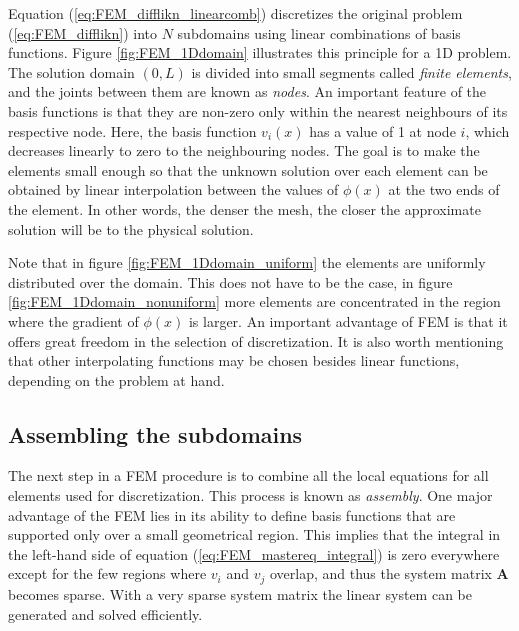 Equation (\ref{eq:FEM_difflikn_linearcomb}) discretizes the original problem (\ref{eq:FEM_difflikn}) into $N$ subdomains using linear combinations of basis functions. Figure \ref{fig:FEM_1Ddomain} illustrates this principle for a 1D problem. The solution domain $(0,L)$ is divided into small segments called \emph{finite elements}, and the joints between them are known as \emph{nodes}. An important feature of the basis functions is that they are non-zero only within the nearest neighbours of its respective node. Here, the basis function $v_i(x)$ has a value of 1 at node $i$, which decreases linearly to zero to the neighbouring nodes. The goal is to make the elements small enough so that the unknown solution over each element can be obtained by linear interpolation between the values of $\phi(x)$ at the two ends of the element. In other words, the denser the mesh, the closer the approximate solution will be to the physical solution.

Note that in figure \ref{fig:FEM_1Ddomain_uniform} the elements are uniformly distributed over the domain. This does not have to be the case, in figure \ref{fig:FEM_1Ddomain_nonuniform} more elements are concentrated in the region where the gradient of $\phi(x)$ is larger. An important advantage of FEM is that it offers great freedom in the selection of discretization. It is also worth mentioning that other interpolating functions may be chosen besides linear functions, depending on the problem at hand.

\subsection{Assembling the subdomains}
The next step in a FEM procedure is to combine all the local equations for all elements used for discretization. This process is known as \emph{assembly}. One major advantage of the FEM lies in its ability to define basis functions that are supported only over a small geometrical region. This implies that the integral in the left-hand side of equation (\ref{eq:FEM_mastereq_integral}) is zero everywhere except for the few regions where $v_i$ and $v_j$ overlap, and thus the system matrix $\mathbf{A}$ becomes sparse. With a very sparse system matrix the linear system can be generated and solved efficiently\cite{FEM_TheoryAndCompOfEM_Jian-Ming_Jin}. 

